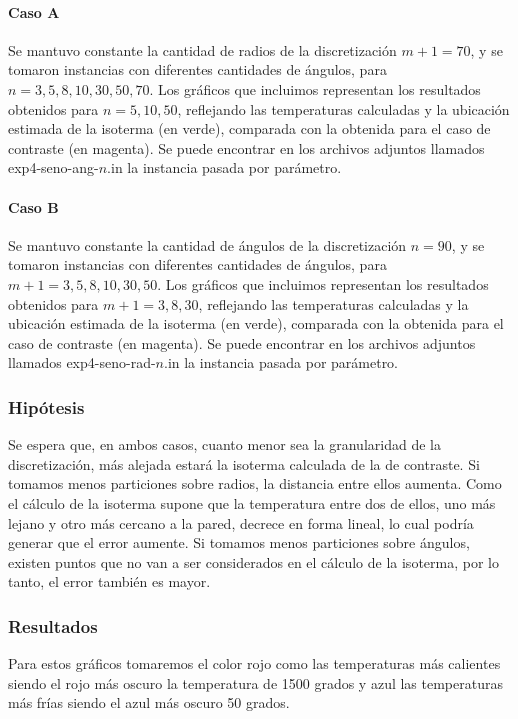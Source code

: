         \paragraph{Caso A} Se mantuvo constante la cantidad de radios de la discretización $m + 1 = 70$, y se tomaron instancias con diferentes cantidades de ángulos, para $n = 3, 5, 8, 10, 30, 50, 70$. Los gráficos que incluimos representan los resultados obtenidos para $n = 5, 10, 50$, reflejando las temperaturas calculadas y la ubicación estimada de la isoterma (en verde), comparada con la obtenida para el caso de contraste (en magenta). Se puede encontrar en los archivos adjuntos llamados exp4-seno-ang-$n$.in la instancia pasada por parámetro.
        
        \paragraph{Caso B} Se mantuvo constante la cantidad de ángulos de la discretización $n = 90$, y se tomaron instancias con diferentes cantidades de ángulos, para $m + 1 = 3, 5, 8, 10, 30, 50$. Los gráficos que incluimos representan los resultados obtenidos para $m + 1 = 3, 8, 30$, reflejando las temperaturas calculadas y la ubicación estimada de la isoterma (en verde), comparada con la obtenida para el caso de contraste (en magenta). Se puede encontrar en los archivos adjuntos llamados exp4-seno-rad-$n$.in la instancia pasada por parámetro.
     
      \subsubsection*{Hipótesis}
          Se espera que, en ambos casos, cuanto menor sea la granularidad de la discretización, más alejada estará la isoterma calculada de la de contraste. Si tomamos menos particiones sobre radios, la distancia entre ellos aumenta. Como el cálculo de la isoterma supone que la temperatura entre dos de ellos, uno más lejano y otro más cercano a la pared, decrece en forma lineal, lo cual podría generar que el error aumente. Si tomamos menos particiones sobre ángulos, existen puntos que no van a ser considerados en el cálculo de la isoterma, por lo tanto, el error también es mayor. 


      \subsubsection*{Resultados}

        Para estos gráficos tomaremos el color rojo como las temperaturas más calientes siendo el rojo más oscuro la temperatura de 1500 grados y azul las temperaturas más frías siendo el azul más oscuro 50 grados.
        

